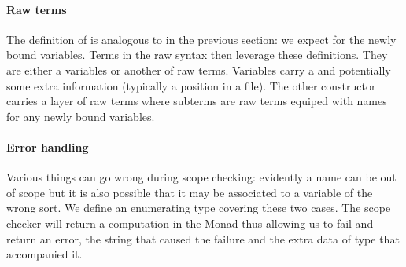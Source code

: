 \noindent
\begin{minipage}{\textwidth}
\begin{minipage}[t]{0.64\textwidth}
\end{minipage}
\begin{minipage}[t]{0.35\textwidth}
\end{minipage}
\end{minipage}

\paragraph*{Raw terms}
The definition of  is analogous to  in the
previous section: we expect  for the newly bound
variables. Terms in the raw syntax then leverage these
definitions. They are either a variables or another  of raw
terms. Variables  carry a  and potentially some
extra information  (typically a position in a file). The other
constructor  carries a layer of raw terms where subterms are
raw terms equiped with names for any newly bound variables.

\begin{agdasnippet}
\end{agdasnippet}

\paragraph*{Error handling} Various things can go wrong during scope checking:
evidently a name can be out of scope but it is also possible that it may be
associated to a variable of the wrong sort. We define an enumerating type
covering these two cases. The scope checker will return a computation in the
Monad  thus allowing us to fail and return an error, the string that
caused the failure and the extra data of type  that accompanied it.

\noindent
\begin{minipage}{\textwidth}
\begin{minipage}[t]{0.5\textwidth}
\end{minipage}
\begin{minipage}[t]{0.4\textwidth}
\end{minipage}
\end{minipage}

